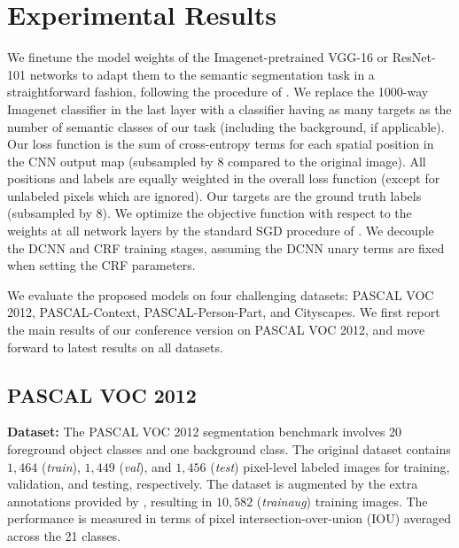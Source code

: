 \section{Experimental Results}
\label{sec:experiments}

We finetune the model weights of the Imagenet-pretrained VGG-16 or ResNet-101
networks to adapt them to the semantic segmentation task in a straightforward
fashion, following the procedure of \cite{long2014fully}. We replace the
1000-way Imagenet classifier in the last layer with a classifier having as many
targets as the number of semantic classes of our task (including the background,
if applicable). Our loss function is the sum of cross-entropy terms for each
spatial position in the CNN output map (subsampled by 8 compared to the original
image). All positions and labels are equally weighted in the overall loss
function (except for unlabeled pixels which are ignored). Our targets are the
ground truth labels (subsampled by 8). We optimize the objective function with
respect to the weights at all network layers by the standard SGD procedure of
\cite{KrizhevskyNIPS2013}. We decouple the DCNN and CRF training stages,
assuming the DCNN unary terms are fixed when setting the CRF parameters.

We evaluate the proposed models on four challenging datasets: PASCAL VOC 2012,
PASCAL-Context, PASCAL-Person-Part, and Cityscapes. We first report the main
results of our conference version \cite{chen2014semantic} on PASCAL VOC 2012,
and move forward to latest results on all datasets.


\subsection{PASCAL VOC 2012}

\textbf{Dataset:} The PASCAL VOC 2012 segmentation benchmark
\cite{everingham2014pascal} involves 20 foreground object classes and one
background class. The original dataset contains $1,464$ (\textit{train}),
$1,449$ (\textit{val}), and $1,456$ (\textit{test}) pixel-level labeled
images for training, validation, and testing, respectively. The dataset is
augmented by the extra annotations provided by \cite{hariharan2011semantic},
resulting in $10,582$ (\textit{trainaug}) training images. The performance
is measured in terms of pixel intersection-over-union (IOU) averaged across
the 21 classes.

